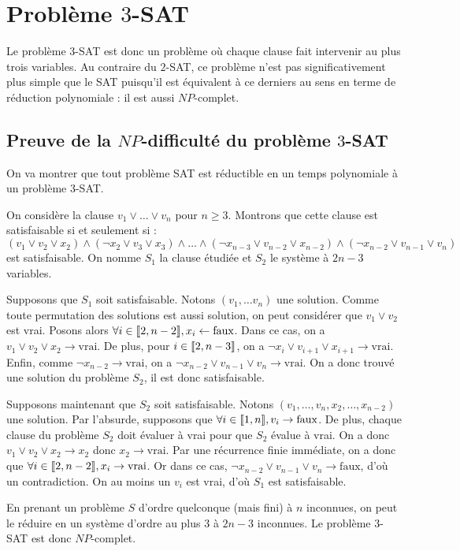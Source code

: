\section{Problème $3$-SAT}
Le problème $3$-SAT est donc un problème où chaque clause fait intervenir au
plus trois variables. Au contraire du $2$-SAT, ce problème n'est pas
significativement plus simple que le SAT puisqu'il est équivalent à ce derniers
au sens en terme de réduction polynomiale : il est aussi $NP$-complet.

\subsection{Preuve de la $NP$-difficulté du problème $3$-SAT}
On va montrer que tout problème SAT est réductible en un temps polynomiale à
un problème 3-SAT.

On considère la clause $v_1 \vee \ldots \vee v_n$ pour $n \geq 3$. Montrons que
cette clause est satisfaisable si et seulement si :
\[ (v_1 \vee v_2 \vee x_2) \wedge (\neg x_2 \vee v_3 \vee x_3) \wedge \ldots
\wedge (\neg x_{n-3} \vee v_{n-2} \vee x_{n-2}) \wedge (\neg x_{n-2} \vee v_{n-1} \vee v_n) \]
est satisfaisable. On nomme $S_1$ la clause étudiée et $S_2$ le système à
$2n - 3$ variables.

Supposons que $S_1$ soit satisfaisable. Notons $(v_1,\ldots v_n)$ une
solution. Comme toute permutation des solutions est aussi solution, on peut
considérer que $v_1 \vee v_2$ est vrai. Posons alors
$\forall i\in\llbracket 2, n-2 \rrbracket, x_i \leftarrow \text{faux}$. Dans ce cas, on a
$v_1 \vee v_2 \vee x_2 \rightarrow \text{vrai}$. De plus, pour $i\in\llbracket 2, n-3 \rrbracket$,
on a $\neg x_i \vee v_{i+1} \vee x_{i+1} \rightarrow \text{vrai}$. Enfin, comme
$\neg x_{n-2} \rightarrow \text{vrai}$, on a
$\neg x_{n-2} \vee v_{n-1} \vee v_n \rightarrow \text{vrai}$. On a donc trouvé
une solution du problème $S_2$, il est donc satisfaisable.

Supposons maintenant que $S_2$ soit satisfaisable. Notons $(v_1,\ldots,v_n,x_2,\ldots,x_{n-2})$
une solution. Par l'absurde, supposons que $\forall i\in\llbracket 1, n \rrbracket, v_i \rightarrow \text{faux}$.
De plus, chaque clause du problème $S_2$ doit évaluer à vrai pour que $S_2$
évalue à vrai. On a donc $v_1\vee v_2\vee x_2 \rightarrow x_2$ donc
$x_2 \rightarrow \text{vrai}$. Par une récurrence finie immédiate, on a donc
que $\forall i\in\llbracket 2, n-2 \rrbracket, x_i \rightarrow\text{vrai}$. Or dans ce cas,
$\neg x_{n-2}\vee v_{n-1}\vee v_n \rightarrow\text{faux}$, d'où un
contradiction. On au moins un $v_i$ est vrai, d'où $S_1$ est satisfaisable.

En prenant un problème $S$ d'ordre quelconque (mais fini) à $n$ inconnues, on
peut le réduire en un système d'ordre au plus $3$ à $2n-3$ inconnues. Le
problème $3$-SAT est donc $NP$-complet.

